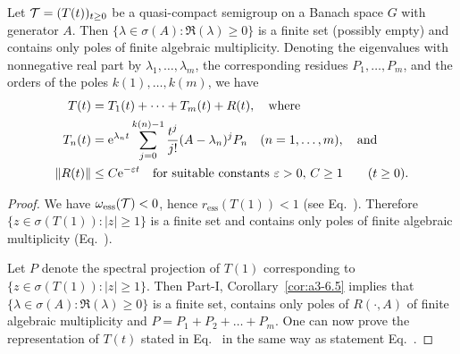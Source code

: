 \begin{theorem}\label{thm:b4-2.10}
  Let $\TT = (T(t))_{t \geq 0}$ be a quasi-compact semigroup on a Banach 
  space $G$ with generator $A$. Then 
  $\{\lambda \in \sigma(A) \colon \Re(\lambda) \geq 0\}$ is a finite set 
  (possibly empty) and contains only poles of finite algebraic multiplicity.
  Denoting the eigenvalues with nonnegative real part by 
  $\lambda_1, \dots, \lambda_m$, the corresponding residues 
  $P_1, \dots, P_m$, and the orders of the poles $k(1), \dots, k(m)$, we have
  \begin{equation}\label{eq:b4-2.5}
    \begin{aligned}
      T(t) &= T_1(t) + \dots + T_m(t) + R(t), \quad \text{where} \\%
      T_n(t) &= \eu^{\lambda_n t} \sum_{j=0}^{k(n) - 1} \frac{t^j}{j!}
               (A - \lambda_n)^j P_n
               \quad (n = 1, \dots, m), \quad \text{and} \\%
      \|R(t)\| &\leq C \eu^{-\epsilon t}
               \quad \text{for suitable constants } \epsilon > 0,\, C \geq 1
               \qquad (t \geq 0).
    \end{aligned}
  \end{equation}
\end{theorem}
\begin{proof} 
We have $\omega_{\text{ess}}(\mathcal{T}) < 0$, hence $r_{\text{ess}}(T(1)) < 1$ (see  Eq.~).
Therefore $\{z \in \sigma(T(1)) \colon |z| \geq 1\}$ is a finite set and contains only poles of finite algebraic multiplicity (\cf Eq.~). 

Let $P$ denote the spectral projection of\/ $T(1)$ corresponding to $\{z \in \sigma(T(1))\colon |z| \geq 1\}$. 
Then Part-I, Corollary~\ref{cor:a3-6.5} implies that $\{\lambda \in \sigma(A) \colon \Re(\lambda) \geq 0\}$ is a finite set, contains only poles of\/ $R(\cdot,A)$ of finite algebraic multiplicity and $P = P_1 + P_2 + \dots + P_m$. 
One can now prove the representation of\/ $T(t)$ stated in Eq.~ in the same way as statement Eq.~.
\end{proof}
